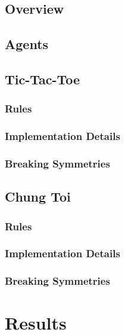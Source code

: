 \documentclass[11pt,a4paper]{report}
\begin{document}
\section{Overview} %


\section{Agents}


\section{Tic-Tac-Toe}

\subsection{Rules}

\subsection{Implementation Details}

\subsection{Breaking Symmetries}


\section{Chung Toi}

\subsection{Rules} %

\subsection{Implementation Details}

\subsection{Breaking Symmetries} %


\chapter{Results}
\end{document}
